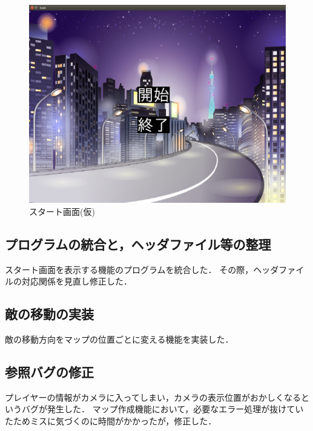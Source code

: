 \documentclass{jarticle}
\begin{document}
\begin{figure}[H]
\begin{center}
\includegraphics[width=\linewidth]{./zu/gamestart.png}
\caption{スタート画面(仮)}
\label{fig:start}
\end{center}
\end{figure}

\subsection{プログラムの統合と，ヘッダファイル等の整理}
スタート画面を表示する機能のプログラムを統合した．
その際，ヘッダファイルの対応関係を見直し修正した．

\subsection{敵の移動の実装}
敵の移動方向をマップの位置ごとに変える機能を実装した．

\subsection{参照バグの修正}
プレイヤーの情報がカメラに入ってしまい，カメラの表示位置がおかしくなるというバグが発生した．
マップ作成機能において，必要なエラー処理が抜けていたためミスに気づくのに時間がかかったが，修正した．
\end{document}
